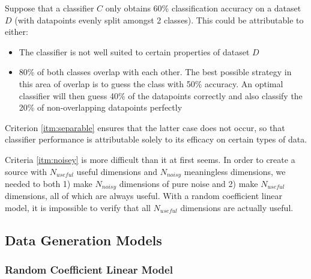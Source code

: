 \documentclass{article}
\begin{document}
Suppose that a classifier $C$ only obtains 60\% classification accuracy on a
dataset $D$ (with datapoints evenly split amongst 2 classes). This could be
attributable to either:
\begin{itemize}
    \item The classifier is not well suited to certain properties of dataset $D$
    \item 80\% of both classes overlap with each other. The best possible
        strategy in this area of overlap is to guess the class with 50\%
        accuracy. An optimal classifier will then guess 40\% of the datapoints
        correctly and also classify the 20\% of non-overlapping datapoints
        perfectly
\end{itemize}
Criterion \ref{itm:separable} ensures that the latter case does not occur,
so that classifier performance is attributable solely to its efficacy on
certain types of data.

Criteria \ref{itm:noisey} is more difficult than it at first seems. In
order to create a source with $N_{useful}$ useful dimensions and $N_{noisy}$
meaningless dimensions, we needed to both 1) make $N_{noisy}$ dimensions of
pure noise and 2) make $N_{useful}$ dimensions, all of which are always useful.
With a random coefficient linear model, it is impossible to verify that all
$N_{useful}$ dimensions are actually useful.



\subsection*{Data Generation Models}

\subsubsection*{Random Coefficient Linear Model}
\end{document}
